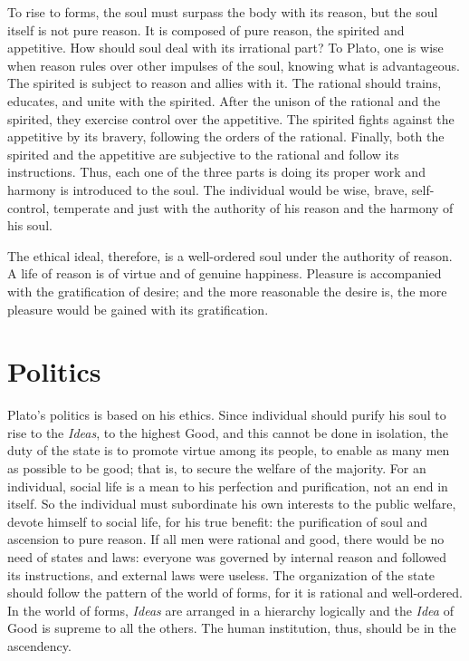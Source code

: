 \documentclass[11pt]{article}
\begin{document}
\begin{sloppypar}
\newline

To rise to forms, the soul must surpass the body with its reason, but the soul itself is not pure reason. 
It is composed of pure reason, the spirited and appetitive. 
How should soul deal with its irrational part? 
To Plato, one is wise when reason rules over other impulses of the soul, knowing what is advantageous. 
The spirited is subject to reason and allies with it. 
The rational should trains, educates, and unite with the spirited. 
After the unison of the rational and the spirited, they exercise control over the appetitive. 
The spirited fights against the appetitive by its bravery, following the orders of the rational. 
Finally, both the spirited and the appetitive are subjective to the rational and follow its instructions. 
Thus, each one of the three parts is doing its proper work and harmony is introduced to the soul. 
The individual would be wise, brave, self-control, temperate and just with the authority of his reason and the harmony of his soul.

\newline

The ethical ideal, therefore, is a well-ordered soul under the authority of reason. 
A life of reason is of virtue and of genuine happiness. 
Pleasure is accompanied with the gratification of desire; 
and the more reasonable the desire is, the more pleasure would be gained with its gratification.
  
\section{Politics}
Plato’s politics is based on his ethics. 
Since individual should purify his soul to rise to the \textit{Ideas}, to the highest Good, and this cannot be done in isolation, the duty of the state is to promote virtue among its people, to enable as many men as possible to be good; 
that is, to secure the welfare of the majority. 
For an individual, social life is a mean to his perfection and purification, not an end in itself. 
So the individual must subordinate his own interests to the public welfare, devote himself to social life, for his true benefit: the purification of soul and ascension to pure reason. 
If all men were rational and good, there would be no need of states and laws: 
everyone was governed by internal reason and followed its instructions, and external laws were useless. 
The organization of the state should follow the pattern of the world of forms, for it is rational and well-ordered. 
In the world of forms, \textit{Ideas} are arranged in a hierarchy logically and the \textit{Idea} of Good is supreme to all the others. 
The human institution, thus, should be in the ascendency.


\end{sloppypar}
\end{document}
